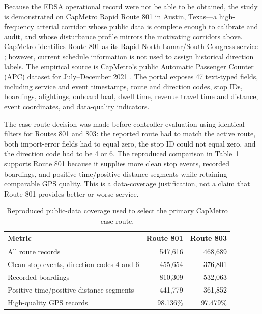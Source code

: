 Because the EDSA operational record were not be able to be obtained, the study is demonstrated on CapMetro Rapid Route 801 in Austin, Texas---a high-frequency arterial corridor whose public data is complete enough to calibrate and audit, and whose disturbance profile mirrors the motivating corridors above. CapMetro identifies Route 801 as its Rapid North Lamar/South Congress service \cite{CapMetroRapid}; however, current schedule information is not used to assign historical direction labels. The empirical source is CapMetro's public Automatic Passenger Counter (APC) dataset for July--December 2021 \cite{TexasCapMetroAPC2021}. The portal exposes 47 text-typed fields, including service and event timestamps, route and direction codes, stop IDs, boardings, alightings, onboard load, dwell time, revenue travel time and distance, event coordinates, and data-quality indicators.

The case-route decision was made before controller evaluation using identical filters for Routes 801 and 803: the reported route had to match the active route, both import-error fields had to equal zero, the stop ID could not equal zero, and the direction code had to be 4 or 6. The reproduced comparison in Table~\ref{tab:capmetro-route-selection} supports Route 801 because it supplies more clean stop events, recorded boardings, and positive-time/positive-distance segments while retaining comparable GPS quality. This is a data-coverage justification, not a claim that Route 801 provides better or worse service.

\begin{table}[htbp]
\centering
\caption{Reproduced public-data coverage used to select the primary CapMetro case route.}
\label{tab:capmetro-route-selection}
\small
\renewcommand{\arraystretch}{1.2}
\begin{tabularx}{\textwidth}{Xrr}
\toprule
\textbf{Metric} & \textbf{Route 801} & \textbf{Route 803} \\
\midrule
All route records & 547{,}616 & 468{,}689 \\
Clean stop events, direction codes 4 and 6 & 455{,}654 & 376{,}801 \\
Recorded boardings & 810{,}309 & 532{,}063 \\
Positive-time/positive-distance segments & 441{,}779 & 361{,}852 \\
High-quality GPS records & 98.136\% & 97.479\% \\
\bottomrule
\end{tabularx}
\end{table}

